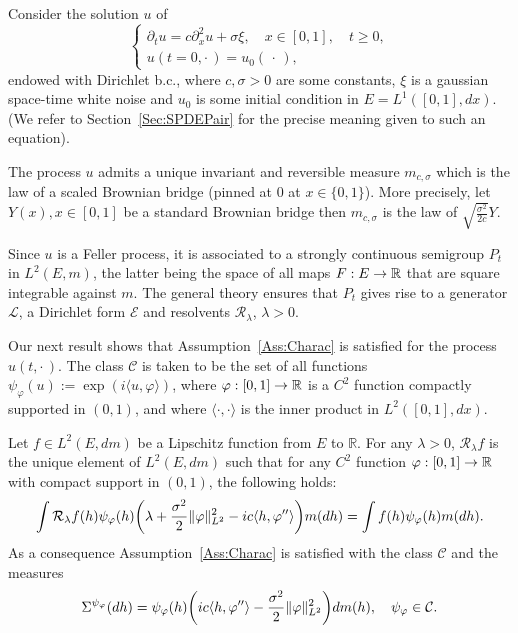 \documentclass[10pt]{amsart}
\theoremstyle{definition}\newtheorem{defi}[theo]{Definition}\newtheorem{rema}[theo]{Remark}\newtheorem{exam}[theo]{Example}\newtheorem{exem}[theo]{Example}\newtheorem{nota}[theo]{Notation}
\theoremstyle{plain}
\newcommand{\cC}{\mathcal{C}}
\newcommand{\cE}{\mathcal{E}}
\newcommand{\cL}{\mathcal{L}}
\newcommand{\cR}{\mathcal{R}}
\newcommand{\R}{\mathbb{R}}
\let\originalleft\left
\let\originalright\right
\renewcommand{\left}{\mathopen{}\mathclose\bgroup\originalleft}
\renewcommand{\right}{\aftergroup\egroup\originalright}
\renewcommand*{\to}{\mathchoice{\longrightarrow}{\rightarrow}{\rightarrow}{\rightarrow}}
\begin{document}
Consider the solution $u$ of
\begin{equation}\label{Eq:SPDEZRP}
\begin{cases} \partial_t u = c\partial_x^2 u + \sigma {\xi},\quad x\in [0,1],\quad t\ge 0,\\
u(t=0,\cdot\,) = u_0(\,\cdot\,),
\end{cases}
\end{equation}
endowed with Dirichlet b.c., where $c,\sigma>0$ are some constants, ${\xi}$ is a gaussian space-time white noise and $u_0$ is some initial condition in $E=L^1([0,1],dx)$. (We refer to Section~\ref{Sec:SPDEPair} for the precise meaning given to such an equation).

The process $u$ admits a unique invariant and reversible measure $m_{c,\sigma}$ which is the law of a scaled Brownian bridge (pinned at $0$ at $x \in\{0,1\}$). More precisely, let $Y(x),x\in [0,1]$ be a standard Brownian bridge then $m_{c,\sigma}$ is the law of $\sqrt{\frac{\sigma^2}{2c}} Y$.

Since $u$ is a Feller process, it is associated to a strongly continuous semigroup $P_t$ in $L^2(E,m)$, the latter being the space of all maps $F:E \to\R$ that are square integrable against $m$. The general theory ensures that $P_t$ gives rise to a generator $\cL$, a Dirichlet form $\cE$ and resolvents $\cR_\lambda$, $\lambda > 0$.

Our next result shows that Assumption~\ref{Ass:Charac} is satisfied for the process $u(t,\cdot\,)$. The class $\cC$ is taken to be the set of all functions $\psi_\varphi(u) := \exp(i \langle u,\varphi\rangle)$, where $\varphi:[0,1]\to\R$ is a $C^2$ function compactly supported in $(0,1)$, and where $\langle \cdot, \cdot \rangle$ is the inner product in $L^2([0,1],dx)$.

\begin{prop}\label{Prop:ZRPCharact}
Let $f\in L^2(E,dm)$ be a Lipschitz function from $E$ to $\R$. For any $\lambda > 0$, $\cR_\lambda f$ is the unique element of $L^2(E,dm)$ such that for any $C^2$ function $\varphi:[0,1]\to\R$ with compact support in $(0,1)$, the following holds:
\begin{equation}\label{Eq:CharactResolZRP}
\int \cR_\lambda f(h) \psi_\varphi(h) \left(\lambda +\frac{\sigma^2}{2} \| \varphi\|_{L^2}^2 - ic \langle h,\varphi''\rangle \right) m(dh) = \int f(h) \psi_\varphi(h) m(dh).
\end{equation}
As a consequence Assumption~\ref{Ass:Charac} is satisfied with the class $\cC$ and the measures
\begin{equation}\label{Eq:SigmaZRP}
\Sigma^{\psi_\varphi}(dh) = \psi_\varphi(h)\left(ic \langle h,\varphi''\rangle -\frac{\sigma^2}{2} \| \varphi\|_{L^2}^2 \right) dm(h),\quad \psi_\varphi \in \cC.
\end{equation}
\end{prop}
\end{document}
